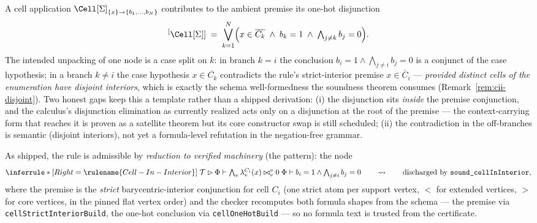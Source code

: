 

\begin{brecipe}
\label{rec:cii-intended}
A cell application $\Cell[\Sigma]_{\{x\}\to\{b_1,\ldots,b_N\}}$
contributes to the ambient premise its one-hot disjunction
\[
\sp[\Cell[\Sigma]] \;=\; \bigvee_{k=1}^{N}\Bigl( x \in \overline{C_k}
\;\wedge\; b_k = 1 \;\wedge\; \textstyle\bigwedge_{j \neq k} b_j = 0 \Bigr).
\]
The intended unpacking of one  node is a
case split on $k$: in branch $k = i$ the conclusion
$b_i = 1 \wedge \bigwedge_{j\neq i} b_j = 0$ is a conjunct of the case
hypothesis; in a branch $k \neq i$ the case hypothesis
$x \in \overline{C_k}$ contradicts the rule's strict-interior premise
$x \in \mathring{C_i}$ --- \emph{provided distinct cells of the
enumeration have disjoint interiors}, which is exactly the schema
well-formedness the soundness theorem consumes
(Remark~\ref{rem:cii-disjoint}). Two honest gaps keep this a template
rather than a shipped derivation: (i) the disjunction sits \emph{inside}
the premise conjunction, and the calculus's disjunction elimination as
currently realized acts only on a disjunction at the root of the premise
--- the context-carrying form that reaches it is proven as a satellite
theorem but its core constructor swap is still scheduled; (ii) the
contradiction in the off-branches is semantic (disjoint interiors), not
yet a formula-level refutation in the negation-free grammar.
\end{brecipe}

\begin{brecipe}
\label{rec:cii-realized}
As shipped, the rule is admissible by \emph{reduction to verified
machinery} (the  pattern): the node
\[
\inferrule*[Right=\rulename{Cell-In-Interior}]
  {\;\mathcal{T} \rhd \Phi \vdash \textstyle\bigwedge_{v}
    \lambda^{C_i}_v(x) \bowtie^{\circ}_v 0\;}
  {\Phi \vdash b_i = 1 \wedge \textstyle\bigwedge_{j \neq i} b_j = 0}
\qquad\rightsquigarrow\qquad
\text{\upshape discharged by } \texttt{sound\_cellInInterior},
\]
where the premise is the \emph{strict} barycentric-interior conjunction
for cell $C_i$ (one strict atom per support vertex, $<$ for extended
vertices, $>$ for core vertices, in the pinned flat vertex order) and
the checker recomputes both formula shapes from the schema --- the
premise via \texttt{cellStrictInteriorBuild}, the one-hot conclusion via
\texttt{cellOneHotBuild} --- so no formula text is trusted from the
certificate.
\end{brecipe}

